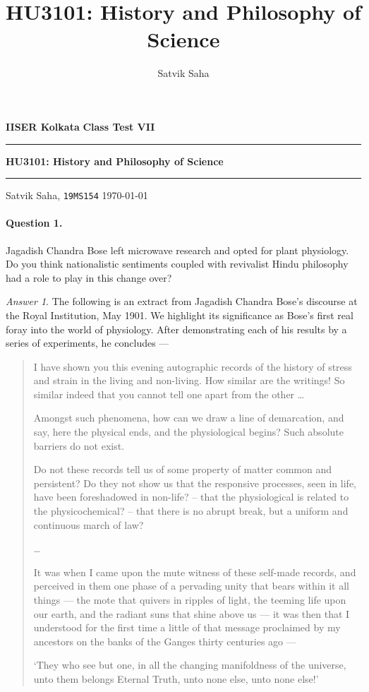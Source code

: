 \documentclass[11pt]{article}
\title{HU3101: History and Philosophy of Science}
\author{Satvik Saha}
\date{}
\theoremstyle{remark}
\newtheorem*{answer}{Answer}
\begin{document}
    \noindent\textbf{IISER Kolkata} \hfill \textbf{Class Test VII}
    \vspace{3pt}
    \hrule
    \vspace{3pt}
    \begin{center}
    \LARGE{\textbf{HU3101: History and Philosophy of Science}}
    \end{center}
    \vspace{3pt}
    \hrule
    \vspace{3pt}
    Satvik Saha, \texttt{19MS154} \hfill \today
    \vspace{20pt}

    \paragraph{Question 1.} Jagadish Chandra Bose left microwave research and opted
    for plant physiology. Do you think nationalistic sentiments coupled with
    revivalist Hindu philosophy had a role to play in this change over?
    
    \begin{answer} The following is an extract from Jagadish Chandra Bose's discourse
    at the Royal Institution, May 1901. We highlight its significance as Bose's first
    real foray into the world of physiology. After demonstrating each of his results
    by a series of experiments, he concludes ---
        \begin{quote}
            I have shown you this evening autographic records of the history of
            stress and strain in the living and non-living. How similar are the
            writings! So similar indeed that you cannot tell one apart from the
            other \dots

            Amongst such phenomena, how can we draw a line of demarcation, and say,
            here the physical ends, and the physiological begins? Such absolute
            barriers do not exist.

            Do not these records tell us of some property of matter common and
            persistent? Do they not show us that the responsive processes, seen in
            life, have been foreshadowed in non-life? -- that the physiological is
            related to the physicochemical? -- that there is no abrupt break, but a
            uniform and continuous march of law?

            \dots

            It was when I came upon the mute witness of these self-made records, and
            perceived in them one phase of a pervading unity that bears within it all
            things — the mote that quivers in ripples of light, the teeming life upon
            our earth, and the radiant suns that shine above us — it was then that I
            understood for the first time a little of that message proclaimed by my
            ancestors on the banks of the Ganges thirty centuries ago --- 

            `They who see but one, in all the changing manifoldness of the universe,
            unto them belongs Eternal Truth, unto none else, unto none else!'
        \end{quote}
    \end{answer}
\end{document}
